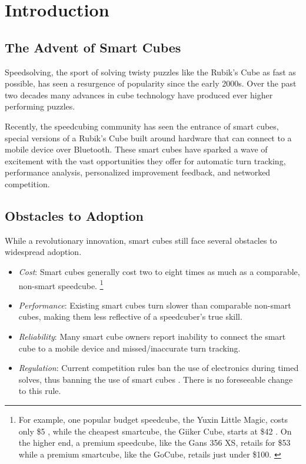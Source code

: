 \chapter{Introduction} 
\label{Chapter1}


\section{The Advent of Smart Cubes}

Speedsolving, the sport of solving twisty puzzles like the Rubik's Cube
as fast as possible, has seen a resurgence of popularity since the
early 2000s. \cite{wca-competition-history} Over the past two decades
many advances in cube technology have produced ever higher performing
puzzles.

Recently, the speedcubing community has seen the entrance of smart
cubes, special versions of a Rubik's Cube built around hardware that
can connect to a mobile device over Bluetooth. These smart cubes have
sparked a wave of excitement with the vast opportunities they offer for
automatic turn tracking, performance analysis, personalized improvement
feedback, and networked competition.


\section{Obstacles to Adoption}

While a revolutionary innovation, smart cubes still face several obstacles to
widespread adoption.

\begin{itemize}

    \item \emph{Cost}: Smart cubes generally cost two to eight times as
    much as a comparable, non-smart speedcube. \footnote{For example,
    one popular budget speedcube, the Yuxin Little Magic, costs only
    \$5 \cite{yuxin-thecubicle}, while the cheapest smartcube, the
    Giiker Cube, starts at \$42 \cite{giiker-thecubicle}. On the higher
    end, a premium speedcube, like the Gans 356 XS, retails for \$53
    \cite{gans-xs-thecubicle} while a premium smartcube, like the
    GoCube, retails just under \$100. \cite{gocube-price}}
    
    \item \emph{Performance}: Existing smart cubes turn slower than
    comparable non-smart cubes, making them less reflective of a
    speedcuber's true skill. \cite{smartcube-regulation-discussion}
    
    \item \emph{Reliability}: Many smart cube owners report inability
    to connect the smart cube to a mobile device and missed/inaccurate
    turn tracking. \cite{smartcube-regulation-discussion}
    
    \item \emph{Regulation}: Current competition rules ban the use of
    electronics during timed solves, thus banning the use of smart
    cubes \cite{wca-regulations}. There is no foreseeable change to
    this rule. \cite{smartcube-regulation-discussion}
    
\end{itemize}

